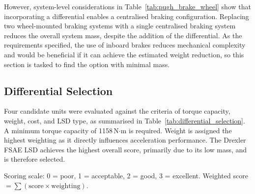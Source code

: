 \documentclass[11pt, a4paper]{report}
\numberwithin{equation}{section}
\begin{document}
\begin{refsection}
However, system-level considerations in Table~\ref{tab:pugh_brake_wheel} show that incorporating a differential enables a centralised braking configuration. Replacing two wheel-mounted braking systems with a single centralised braking system reduces the overall system mass, despite the addition of the differential. As the requirements specified, the use of inboard brakes reduces mechanical complexity and would be beneficial if it can achieve the estimated weight reduction, so this section is tasked to find the option with minimal mass.

\subsection{Differential Selection}

Four candidate units were evaluated against the criteria of torque capacity, weight, cost, and LSD type, as summarised in Table~\ref{tab:differential_selection}. A minimum torque capacity of 1158\,N$\cdot$m is required. Weight is assigned the highest weighting as it directly influences acceleration performance. The Drexler FSAE LSD achieves the highest overall score, primarily due to its low mass, and is therefore selected.

\begin{table}[H]
\centering
\small
\renewcommand{\arraystretch}{1}
\setlength{\tabcolsep}{3pt}
\caption{Merit Matrix for Differential Selection}
\label{tab:differential_selection}
\small
Scoring scale: 0 = poor, 1 = acceptable, 2 = good, 3 = excellent.
Weighted score $= \sum (\text{score} \times \text{weighting})$.
\end{table}


\end{refsection}
\end{document}
